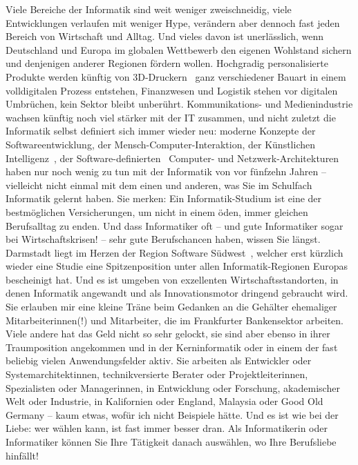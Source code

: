 {    Viele Bereiche der Informatik sind weit weniger zweischneidig, viele Entwicklungen verlaufen mit weniger Hype, verändern aber dennoch fast jeden Bereich von Wirtschaft und Alltag. Und vieles davon ist unerlässlich, wenn Deutschland und Europa im globalen Wettbewerb den eigenen Wohlstand sichern und denjenigen anderer Regionen fördern wollen. Hochgradig personalisierte Produkte werden künftig von \glqq 3D-Druckern\grqq~ ganz verschiedener Bauart in einem volldigitalen Prozess entstehen, Finanzwesen und Logistik stehen vor \glqq digitalen\grqq~ Umbrüchen, kein Sektor bleibt unberührt. Kommunikations- und Medienindustrie wachsen künftig noch viel stärker mit der IT zusammen, und nicht zuletzt die Informatik selbst definiert sich immer wieder neu: moderne Konzepte der Softwareentwicklung, der Mensch-Computer-Interaktion, der \glqq Künstlichen Intelligenz\grqq~, der \glqq Software-definierten\grqq~ Computer- und Netzwerk-Architekturen haben nur noch wenig zu tun mit der Informatik von vor fünfzehn Jahren -- vielleicht nicht einmal mit dem einen und anderen, was Sie im Schulfach Informatik gelernt haben. Sie merken: Ein Informatik-Studium ist eine der bestmöglichen Versicherungen, um nicht in einem öden, immer gleichen Berufsalltag zu enden. Und dass Informatiker oft -- und gute Informatiker sogar bei Wirtschaftskrisen! -- sehr gute Berufschancen haben, wissen Sie längst. Darmstadt liegt im Herzen der Region \glqq Software Südwest\grqq~, welcher erst kürzlich wieder eine Studie eine Spitzenposition unter allen Informatik-Regionen Europas bescheinigt hat. Und es ist umgeben von exzellenten Wirtschaftsstandorten, in denen Informatik angewandt und als Innovationsmotor dringend gebraucht wird. Sie erlauben mir eine kleine Träne beim Gedanken an die Gehälter ehemaliger Mitarbeiterinnen(!) und Mitarbeiter, die im Frankfurter Bankensektor arbeiten. Viele andere hat das Geld nicht so sehr gelockt, sie sind aber ebenso in ihrer Traumposition angekommen und in der Kerninformatik oder in einem der fast beliebig vielen Anwendungsfelder aktiv. Sie arbeiten als Entwickler oder Systemarchitektinnen, technikversierte Berater oder Projektleiterinnen, Spezialisten oder Managerinnen, in Entwicklung oder Forschung, akademischer Welt oder Industrie, in Kalifornien oder England, Malaysia oder Good Old Germany -- kaum etwas, wofür ich nicht Beispiele hätte. Und es ist wie bei der Liebe: wer wählen kann, ist fast immer besser dran. Als Informatikerin oder Informatiker können Sie Ihre Tätigkeit danach auswählen, wo Ihre Berufsliebe hinfällt!

}
